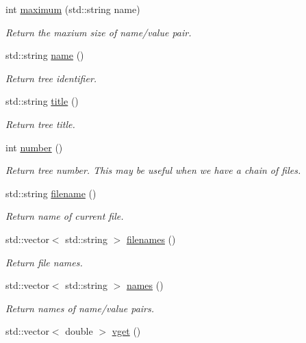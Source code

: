 \begin{CompactItemize}
int \hyperlink{classitreestream_a22}{maximum} (std::string name)
\begin{CompactList}\small\item\em Return the maxium size of name/value pair. \item\end{CompactList}\item 
std::string \hyperlink{classitreestream_a23}{name} ()
\begin{CompactList}\small\item\em Return tree identifier. \item\end{CompactList}\item 
std::string \hyperlink{classitreestream_a24}{title} ()
\begin{CompactList}\small\item\em Return tree title. \item\end{CompactList}\item 
int \hyperlink{classitreestream_a25}{number} ()
\begin{CompactList}\small\item\em Return tree number. This may be useful when we have a chain of files. \item\end{CompactList}\item 
std::string \hyperlink{classitreestream_a26}{filename} ()
\begin{CompactList}\small\item\em Return name of current file. \item\end{CompactList}\item 
std::vector$<$ std::string $>$ \hyperlink{classitreestream_a27}{filenames} ()
\begin{CompactList}\small\item\em Return file names. \item\end{CompactList}\item 
std::vector$<$ std::string $>$ \hyperlink{classitreestream_a28}{names} ()
\begin{CompactList}\small\item\em Return names of name/value pairs. \item\end{CompactList}\item 
std::vector$<$ double $>$ \hyperlink{classitreestream_a29}{vget} ()
\item 

\end{CompactItemize}
